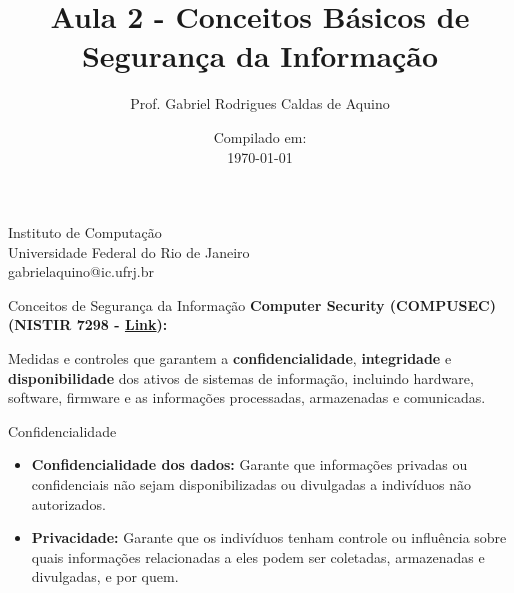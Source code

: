 \title{Aula 2 - Conceitos Básicos de Segurança da Informação}

\author{Prof. Gabriel Rodrigues Caldas de Aquino}

\institute
{
    Instituto de Computação \\
    Universidade Federal do Rio de Janeiro \\
    gabrielaquino@ic.ufrj.br%
}
\date{Compilado em: \\ \today} %



\begin{frame}
    \titlepage
\end{frame}



\begin{frame}{Conceitos de Segurança da Informação}
    \textbf{Computer Security (COMPUSEC) (NISTIR 7298 - \href{https://csrc.nist.gov/pubs/ir/7298/r3/final}{Link}):}
    \begin{block}{}
        Medidas e controles que garantem a \textbf{confidencialidade}, \textbf{integridade} e \textbf{disponibilidade} dos ativos de sistemas de informação, incluindo hardware, software, firmware e as informações processadas, armazenadas e comunicadas.
    \end{block}

    \vspace{0.5cm}


\end{frame}
\begin{frame}{Confidencialidade}



    \begin{itemize}
        \item \textbf{Confidencialidade dos dados:} Garante que informações privadas ou confidenciais não sejam disponibilizadas ou divulgadas a indivíduos não autorizados.
        \item \textbf{Privacidade:} Garante que os indivíduos tenham controle ou influência sobre quais informações relacionadas a eles podem ser coletadas, armazenadas e divulgadas, e por quem.
    \end{itemize}

\end{frame}

